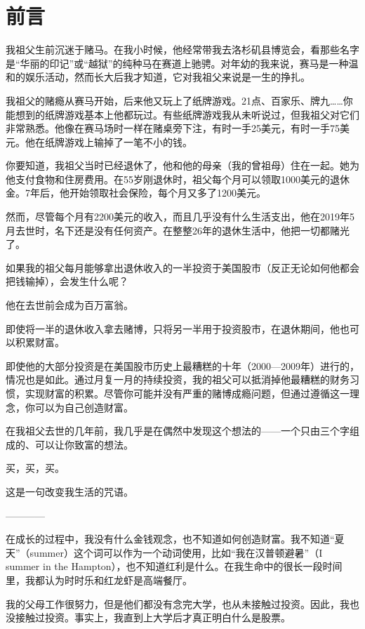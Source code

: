 \section{前言}

我祖父生前沉迷于赌马。在我小时候，他经常带我去洛杉矶县博览会，看那些名字是“华丽的印记”或“越狱”的纯种马在赛道上驰骋。对年幼的我来说，赛马是一种温和的娱乐活动，然而长大后我才知道，它对我祖父来说是一生的挣扎。

我祖父的赌瘾从赛马开始，后来他又玩上了纸牌游戏。21点、百家乐、牌九……你能想到的纸牌游戏基本上他都玩过。有些纸牌游戏我从未听说过，但我祖父对它们非常熟悉。他像在赛马场时一样在赌桌旁下注，有时一手25美元，有时一手75美元。他在纸牌游戏上输掉了一笔不小的钱。

你要知道，我祖父当时已经退休了，他和他的母亲（我的曾祖母）住在一起。她为他支付食物和住房费用。在55岁刚退休时，祖父每个月可以领取1000美元的退休金。7年后，他开始领取社会保险，每个月又多了1200美元。

然而，尽管每个月有2200美元的收入，而且几乎没有什么生活支出，他在2019年5月去世时，名下还是没有任何资产。在整整26年的退休生活中，他把一切都赌光了。

如果我的祖父每月能够拿出退休收入的一半投资于美国股市（反正无论如何他都会把钱输掉），会发生什么呢？

他在去世前会成为百万富翁。

即使将一半的退休收入拿去赌博，只将另一半用于投资股市，在退休期间，他也可以积累财富。

即使他的大部分投资是在美国股市历史上最糟糕的十年（2000—2009年）进行的，情况也是如此。通过月复一月的持续投资，我的祖父可以抵消掉他最糟糕的财务习惯，实现财富的积累。尽管你可能并没有严重的赌博成瘾问题，但通过遵循这一理念，你可以为自己创造财富。

在我祖父去世的几年前，我几乎是在偶然中发现这个想法的——一个只由三个字组成的、可以让你致富的想法。

买，买，买。

这是一句改变我生活的咒语。

\begin{center}
————
\end{center}

在成长的过程中，我没有什么金钱观念，也不知道如何创造财富。我不知道“夏天”（summer）这个词可以作为一个动词使用，比如“我在汉普顿避暑”（I summer in the Hampton），也不知道红利是什么。在我生命中的很长一段时间里，我都认为时时乐和红龙虾是高端餐厅。

我的父母工作很努力，但是他们都没有念完大学，也从未接触过投资。因此，我也没接触过投资。事实上，我直到上大学后才真正明白什么是股票。

